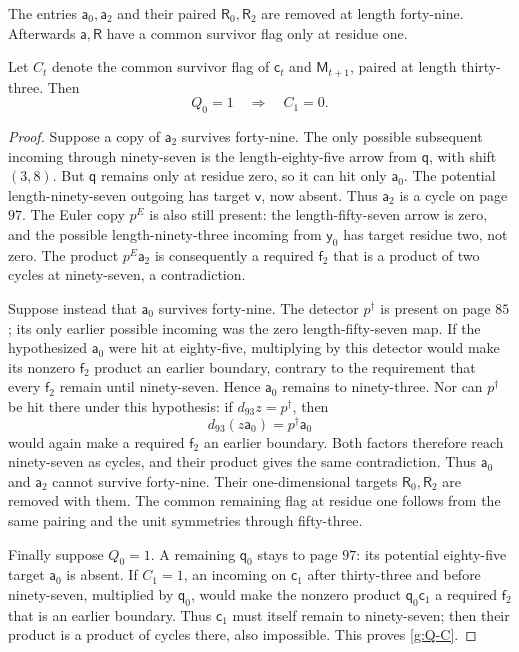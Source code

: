 \begin{lemma}\label{g:a-removal}
The entries $\mathsf a_0,\mathsf a_2$ and their
paired $\mathsf R_0,\mathsf R_2$ are removed at
length forty-nine.  Afterwards $\mathsf a,\mathsf R$
have a common survivor flag only at residue one.

Let $C_t$ denote the common survivor flag of
$\mathsf c_t$ and $\mathsf M_{t+1}$, paired at
length thirty-three.  Then
\begin{equation}\label{g:Q-C}
 Q_0=1\quad\Longrightarrow\quad C_1=0.
\end{equation}
\end{lemma}

\begin{proof}
Suppose a copy of $\mathsf a_2$ survives forty-nine.
The only possible subsequent incoming through
ninety-seven is the length-eighty-five arrow from
$\mathsf q$, with shift $(3,8)$.  But $\mathsf q$
remains only at residue zero, so it can hit only
$\mathsf a_0$.  The potential length-ninety-seven
outgoing has target $\mathsf v$, now absent.
Thus $\mathsf a_2$ is a cycle on page $97$.
The Euler copy $p^E$ is also still present: the
length-fifty-seven arrow is zero, and the possible
length-ninety-three incoming from $\mathsf y_0$
has target residue two, not zero.  The product
$p^E\mathsf a_2$ is consequently a required
$\mathsf f_2$ that is a product of two cycles at
ninety-seven, a contradiction.

Suppose instead that $\mathsf a_0$ survives forty-nine.
The detector $p^\dagger$ is present on page $85$;
its only earlier possible incoming was the zero
length-fifty-seven map.  If the hypothesized
$\mathsf a_0$ were hit at eighty-five, multiplying
by this detector would make its nonzero
$\mathsf f_2$ product an earlier boundary, contrary
to the requirement that every $\mathsf f_2$ remain
until ninety-seven.  Hence $\mathsf a_0$ remains
to ninety-three.  Nor can $p^\dagger$ be hit there
under this hypothesis: if $d_{93}z=p^\dagger$, then
\[
 d_{93}(z\mathsf a_0)=p^\dagger\mathsf a_0
\]
would again make a required $\mathsf f_2$ an
earlier boundary.  Both factors therefore reach
ninety-seven as cycles, and their product gives the
same contradiction.  Thus $\mathsf a_0$ and
$\mathsf a_2$ cannot survive forty-nine.  Their
one-dimensional targets $\mathsf R_0,\mathsf R_2$
are removed with them.  The common remaining flag
at residue one follows from the same pairing and
the unit symmetries through fifty-three.

Finally suppose $Q_0=1$.  A remaining
$\mathsf q_0$ stays to page $97$: its potential
eighty-five target $\mathsf a_0$ is absent.
If $C_1=1$, an incoming on $\mathsf c_1$ after
thirty-three and before ninety-seven, multiplied by $\mathsf q_0$, would
make the nonzero product $\mathsf q_0\mathsf c_1$
a required $\mathsf f_2$ that is an earlier
boundary.  Thus $\mathsf c_1$ must itself remain
to ninety-seven; then their product is a product
of cycles there, also impossible.  This proves
\eqref{g:Q-C}.
\end{proof}

